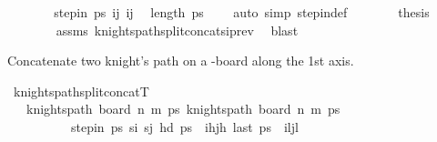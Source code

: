 \begin{isabellebody}
\ \ \ \ \isamarkupfalse%
\ \isamarkupfalse%
\ {\isachardoublequoteopen}step{\isacharunderscore}{\kern0pt}in\ ps\ {\isacharparenleft}{\kern0pt}ij\ {\isacharparenleft}{\kern0pt}ij\ \isamarkupfalse%
\ {\isacartoucheopen}length\ ps\ {\isachargreater}{\kern0pt}\ {}{\isacartoucheclose}\ \isamarkupfalse%
\ {\isacharparenleft}{\kern0pt}auto\ simp{\isacharcolon}{\kern0pt}\ step{\isacharunderscore}{\kern0pt}in{\isacharunderscore}{\kern0pt}def{\isacharparenright}{\kern0pt}\isanewline
\ \ \ \ \isamarkupfalse%
\ \isamarkupfalse%
\ {\isacharquery}{\kern0pt}thesis\isanewline
\ \ \ \ \ \ \isamarkupfalse%
\ assms\ knights{\isacharunderscore}{\kern0pt}path{\isacharunderscore}{\kern0pt}split{\isacharunderscore}{\kern0pt}concat{\isacharunderscore}{\kern0pt}si{\isacharunderscore}{\kern0pt}prev\ \isamarkupfalse%
\ blast\isanewline
\ \ \isamarkupfalse%
\isanewline
{}\isamarkupfalse%
%
\endisatagproof
{\isafoldproof}%
%
\isadelimproof
%
\endisadelimproof
%
\begin{isamarkuptext}%
Concatenate two knight's path on a -board along the 1st axis.%
\end{isamarkuptext}\isamarkuptrue%
\isamarkupfalse%
\ knights{\isacharunderscore}{\kern0pt}path{\isacharunderscore}{\kern0pt}split{\isacharunderscore}{\kern0pt}concatT{\isacharcolon}{\kern0pt}\isanewline
\ \ \ {\isachardoublequoteopen}knights{\isacharunderscore}{\kern0pt}path\ {\isacharparenleft}{\kern0pt}board\ n\ m{\isacharparenright}{\kern0pt}\ ps\ {\isachardoublequoteopen}knights{\isacharunderscore}{\kern0pt}path\ {\isacharparenleft}{\kern0pt}board\ n\ m{\isacharparenright}{\kern0pt}\ ps\ \isanewline
\ \ \ \ \ \ \ \ \ \ {\isachardoublequoteopen}step{\isacharunderscore}{\kern0pt}in\ ps\ s\isactrlsub i\ s\isactrlsub j{\isachardoublequoteclose}\ {\isachardoublequoteopen}hd\ ps\ {\isacharequal}{\kern0pt}\ {\isacharparenleft}{\kern0pt}i\isactrlsub h{\isacharcomma}{\kern0pt}j\isactrlsub h{\isacharparenright}{\kern0pt}{\isachardoublequoteclose}\ {\isachardoublequoteopen}last\ ps\ {\isacharequal}{\kern0pt}\ {\isacharparenleft}{\kern0pt}i\isactrlsub l{\isacharcomma}{\kern0pt}j\isactrlsub l{\isacharparenright}{\kern0pt}{\isachardoublequoteclose}\isanewline

\end{isabellebody}
